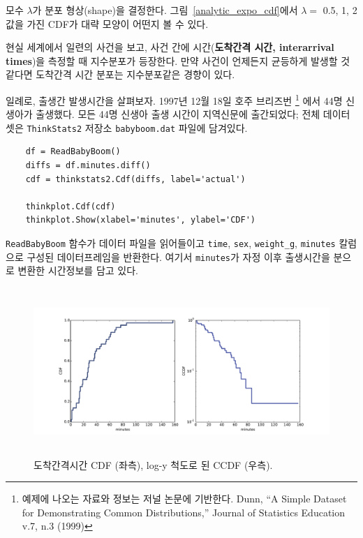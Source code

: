 모수 $\lambda$가 분포 형상(shape)을 결정한다. 
그림~\ref{analytic_expo_cdf}에서 $\lambda = $ 0.5, 1, 2 값을 가진
CDF가 대략 모양이 어떤지 볼 수 있다.

현실 세계에서 일련의 사건을 보고, 사건 간에 시간({\bf 도착간격 시간, interarrival times})을 측정할 때 지수분포가 등장한다.
만약 사건이 언제든지 균등하게 발생할 것 같다면 도착간격 시간 분포는 지수분포같은 경향이 있다.

일례로, 출생간 발생시간을 살펴보자. 1997년 12월 18일 호주 브리즈번
\footnote{예제에 나오는 자료와 정보는 저널 논문에 기반한다. Dunn, ``A Simple Dataset for Demonstrating Common Distributions,'' Journal of Statistics Education v.7, n.3 (1999)}
에서 44명 신생아가 출생했다. 모든 44명 신생아 출생 시간이 지역신문에 출간되었다;
전체 데이터셋은 {\tt ThinkStats2} 저장소 {\tt babyboom.dat} 파일에 담겨있다.

\begin{verbatim}
    df = ReadBabyBoom()
    diffs = df.minutes.diff()
    cdf = thinkstats2.Cdf(diffs, label='actual')

    thinkplot.Cdf(cdf)
    thinkplot.Show(xlabel='minutes', ylabel='CDF')
\end{verbatim}

{\tt ReadBabyBoom} 함수가 데이터 파일을 읽어들이고 {\tt time}, {\tt sex}, \verb"weight_g", {\tt minutes}
칼럼으로 구성된 데이터프레임을 반환한다.
여기서 {\tt minutes}가 자정 이후 출생시간을 분으로 변환한 시간정보를 담고 있다.

\begin{figure}
\centerline{\includegraphics[height=2.5in]{figs/analytic_interarrivals.pdf}}
\caption{도착간격시간 CDF (좌측), log-y 척도로 된 CCDF (우측).}
\label{analytic_interarrival_cdf}
\end{figure}

